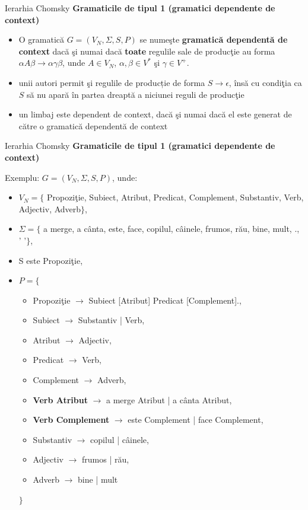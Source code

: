 \documentclass[pdf]{beamer}
\begin{document}
\begin{frame}{Ierarhia Chomsky}
\textbf{Gramaticile de tipul 1 (gramatici dependente de context)}
\begin{itemize}
\item
O gramatică $G = (V_{N}, \Sigma, S, P )$ se numeşte \textbf{gramatică dependentă de context} dacă şi numai dacă \textbf{toate} regulile sale de producţie au forma $\alpha A \beta \rightarrow \alpha \gamma \beta$, unde $A \in V_{N}$, $\alpha, \beta \in V^{*}$ şi $\gamma \in V^{+}$.
\item
unii autori permit şi regulile de producție de forma $S \rightarrow \epsilon$, însă cu condiţia ca $S$ să nu apară în partea dreaptă a niciunei reguli de producţie
\item
un limbaj este dependent de context, dacă şi numai dacă el este generat de către o gramatică dependentă de context
\end{itemize}
\end{frame}



\begin{frame}{Ierarhia Chomsky}
\textbf{Gramaticile de tipul 1 (gramatici dependente de context)}

Exemplu: $G = (V_{N}, \Sigma, S, P )$, unde:

\begin{itemize}
\item
$V_{N} = \{$ Propoziţie, Subiect, Atribut, Predicat, Complement, Substantiv, Verb, Adjectiv, Adverb$\}$,
\item
$\Sigma = \{$ a merge, a cânta, este, face, copilul, câinele, frumos, rău, bine, mult, ., ' '$\}$,
\item
S este Propoziţie,
\item
$P = \{$
\begin{itemize}
\item
Propoziţie $\rightarrow$ Subiect [Atribut] Predicat [Complement].,
\item
Subiect $\rightarrow$ Substantiv | Verb,
\item
Atribut $\rightarrow$ Adjectiv,
\item
Predicat $\rightarrow$ Verb,
\item
Complement $\rightarrow$ Adverb,
\item
\textbf{Verb Atribut} $\rightarrow$ a merge Atribut | a cânta Atribut,
\item
\textbf{Verb Complement} $\rightarrow$ este Complement | face Complement,
\item
Substantiv $\rightarrow$ copilul | câinele,
\item
Adjectiv $\rightarrow$ frumos | rău,
\item
Adverb $\rightarrow$ bine | mult
\end{itemize}
$\}$
\end{itemize}
\end{frame}
\end{document}

